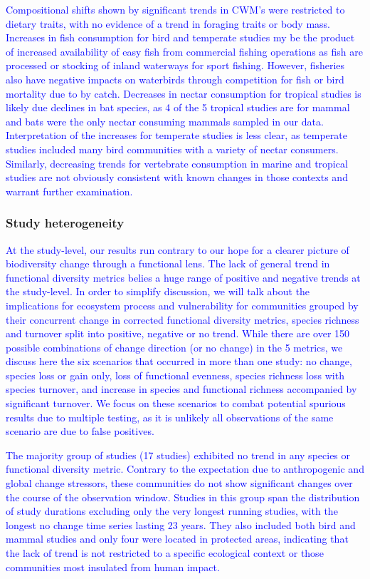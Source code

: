 \documentclass{article}
\begin{document}
\textcolor{blue}{Compositional shifts shown by significant trends in CWM's were restricted to dietary traits, with no evidence of a trend in foraging traits or body mass. Increases in fish consumption for bird and temperate studies my be the product of increased availability of easy fish from commercial fishing operations as fish are processed or stocking of inland waterways for sport fishing. However, fisheries also have negative impacts on waterbirds through competition for fish or bird mortality due to by catch. Decreases in nectar consumption for tropical studies is likely due declines in bat species, as 4 of the 5 tropical studies are for mammal and bats were the only nectar consuming mammals sampled in our data. Interpretation of the increases for temperate studies is less clear, as temperate studies included many bird communities with a variety of nectar consumers. Similarly, decreasing trends for vertebrate consumption in marine and tropical studies are not obviously consistent with known changes in those contexts and warrant further examination.}

\hypertarget{study-heterogeneity}{%
\subsubsection{Study heterogeneity}\label{study-heterogeneity}}

\textcolor{blue}{At the study-level, our results run contrary to our hope for a clearer picture of biodiversity change through a functional lens. The lack of general trend in functional diversity metrics belies a huge range of positive and negative trends at the study-level. In order to simplify discussion, we will talk about the implications for ecosystem process and vulnerability for communities grouped by their concurrent change in corrected functional diversity metrics, species richness and turnover split into positive, negative or no trend. While there are over 150 possible combinations of change direction (or no change) in the 5 metrics, we discuss here the six scenarios that occurred in more than one study: no change, species loss or gain only, loss of functional evenness, species richness loss with species turnover, and increase in species and functional richness accompanied by significant turnover. We focus on these scenarios to combat potential spurious results due to multiple testing, as it is unlikely all observations of the same scenario are due to false positives.}

\textcolor{blue}{The majority group of studies (17 studies) exhibited no trend in any species or functional diversity metric. Contrary to the expectation due to anthropogenic and global change stressors, these communities do not show significant changes over the course of the observation window. Studies in this group span the distribution of study durations excluding only the very longest running studies, with the longest no change time series lasting 23 years. They also included both bird and mammal studies and only four were located in protected areas, indicating that the lack of trend is not restricted to a specific ecological context or those communities most insulated from human impact.}
\end{document}
